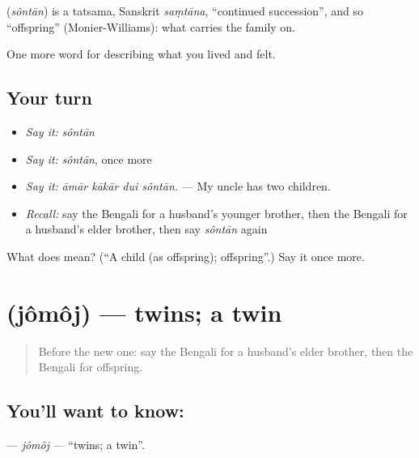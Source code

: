 \begin{cousinweb}
\textbf{} (\emph{sôntān}) is a tatsama, Sanskrit \emph{saṃtāna}, \textquotedblleft{}continued succession\textquotedblright{}, and so \textquotedblleft{}offspring\textquotedblright{} (Monier-Williams): what carries the family on.
\end{cousinweb}

\begin{grammarlens}[title={What you've built}]
One more word for describing what you lived and felt.
\end{grammarlens}

\subsection*{Your turn}
\begin{itemize}
\raggedright
  \item \emph{Say it:} \emph{sôntān}
  \item \emph{Say it:} \emph{sôntān}, once more
  \item \emph{Say it:} \emph{āmār kākār dui sôntān.} — My uncle has two children.
  \item \emph{Recall:} say the Bengali for a husband's younger brother, then the Bengali for a husband's elder brother, then say \emph{sôntān} again
\end{itemize}

\begin{tcolorbox}[breakable,colback=teal!4,colframe=teal!35!black,title={Before you move on}]
What does  mean? (\textquotedblleft{}A child (as offspring); offspring\textquotedblright{}.) Say it once more.
\end{tcolorbox}
\section[\texorpdfstring{\bn{যমজ} (jômôj)}{যমজ (jômôj)}]{ (jômôj) — twins; a twin}

\label{lesson:BN-C484-jomoj}



\begin{quote}
Before the new one: say the Bengali for a husband's elder brother, then the Bengali for offspring.
\end{quote}

\subsection*{You'll want to know: }
\textbf{} — \emph{jômôj} — \textquotedblleft{}twins; a twin\textquotedblright{}.


